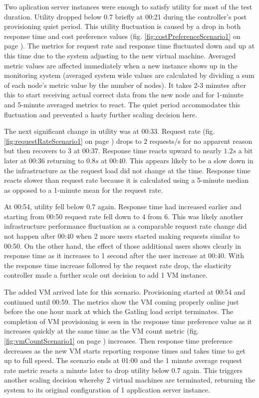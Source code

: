 \documentclass[english]{tktltiki2}
\theoremstyle{definition}
\theoremstyle{remark}
\begin{document}
Two aplication server instances were enough to satisfy utility for most of the
test duration. Utility dropped below $0.7$ briefly at 00:21 during the
controller's post provisioning quiet period. This utility fluctuation is caused
by a drop in both response time and cost preference values (fig.
\ref{fig:costPreferenceScenario1} on page
\pageref{fig:costPreferenceScenario1}). The metrics for request rate and
response time fluctuated down and up at this time due to the system adjusting to
the new virtual machine. Averaged metric values are affected immediately when a
new instance shows up in the monitoring system (averaged system wide values are
calculated by dividing a sum of each node's metric value by the number of
nodes). It takes 2-3 minutes after this to start receiving actual correct data
from the new node and for 1-minute and 5-minute averaged metrics to react. The
quiet period accommodates this fluctuation and prevented a hasty further scaling
decision here.

The next significant change in utility was at 00:33. Request rate (fig.
\ref{fig:requestRateScenario1} on page \pageref{fig:requestRateScenario1}) drops
to $2$ requests/s for no apparent reason but then recovers to $3$ at 00:37.
Response time reacts upward to nearly $1.2 s$ a bit later at 00:36 returning to
$0.8 s$ at 00:40. This appears likely to be a slow down in the infrastructure as
the request load did not change at the time. Response time reacts slower than
request rate because it is calculated using a 5-minute median as opposed to a
1-minute mean for the request rate.

At 00:54, utility fell below $0.7$ again. Response time had increased earlier
and starting from 00:50 request rate fell down to $4$ from $6$. This was likely
another infrastructure performance fluctuation as a comparable request rate
change did not happen after 00:40 when 2 more users started making requests
similar to 00:50. On the other hand, the effect of those additional users shows
clearly in response time as it increases to 1 second after the user increase at
00:40. With the response time increase followed by the request rate drop, the
elasticity controller made a further scale out decision to add 1 VM instance.

The added VM arrived late for this scenario. Provisioning started at 00:54 and
continued until 00:59. The metrics show the VM coming properly online just
before the one hour mark at which the Gatling load script terminates. The
completion of VM provisioning is seen in the response time preference value as
it increases quickly at the same time as the VM count metric (fig.
\ref{fig:vmCountScenario1} on page \pageref{fig:vmCountScenario1}) increases.
Then response time preference decreases as the new VM starts reporting response
times and takes time to get up to full speed. The scenario ends at 01:00 and the
1 minute average request rate metric reacts a minute later to drop utility below
$0.7$ again. This triggers another scaling decision whereby 2 virtual machines
are terminated, returning the system to its original configuration of 1
application server instance.
\end{document}
